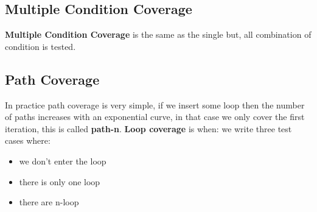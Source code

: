 \documentclass[12pt]{article}
\begin{document}
\subsection{Multiple Condition Coverage}
\textbf{Multiple Condition Coverage} is the same as the single but, all combination of condition is tested.

\subsection{Path Coverage}
In practice path coverage is very simple, if we insert some loop then the number of paths increases with an exponential curve, in that case we only cover the first iteration, this is called \textbf{path-n}. \textbf{Loop coverage} is when: we write three test cases where:
\begin{itemize}
  \item we don't enter the loop
  \item there is only one loop
  \item there are n-loop
\end{itemize}




\newpage
\end{document}
